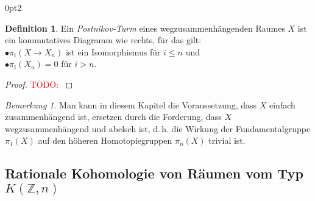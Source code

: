 \documentclass[11pt, a4paper, german]{article}
\theoremstyle{definition}
\newtheorem*{defn}{Definition}
\theoremstyle{remark}
\newtheorem*{bem}{Bemerkung}
\newcommand{\TODO}[1]{\textcolor{red}{TODO: #1}} %
\newcommand{\Z}{\mathbb{Z}} %
\renewcommand{\dh}{d.\,h.} %
\newenvironment{centertikzcd}
  {\begin{center}\begin{tikzcd}}
  {\end{tikzcd}\end{center}}
\begin{document}
\renewcommand\windowpagestuff{
  \iffalse
  \begin{centertikzcd}[ampersand replacement=\&, column sep=0.5cm, row sep=0.2cm]
    \& \vdots \arrow[d] \\
    \& X_3 \arrow[d] \\
    \& X_2 \arrow[d] \\
    X \arrow[r] \arrow[ru] \arrow[ruu] \& X_1
  \end{centertikzcd}
  \fi
  \vspace{1cm}
  \begin{centertikzcd}[ampersand replacement=\&, column sep=0.2cm, row sep=0.5cm]
    \&\&\& X \arrow[dll] \arrow[dl] \arrow[d] \\
    \dots \arrow[r] \&
    X_3 \arrow[r] \&
    X_2 \arrow[r] \&
    X_1
  \end{centertikzcd}
}
\opencutright
\begin{cutout}{0}{\dimexpr\linewidth-4.5cm\relax}{0pt}{2}
  \begin{defn}
    Ein \emph{Postnikov-Turm} eines wegzusammenhängenden Raumes $X$ ist ein kommutatives Diagramm wie rechts, für das gilt: \\[3pt]
    \quad$\bullet$\enspace $\pi_i(X \to X_n)$ ist ein Isomorphismus für $i \leq n$ und \\
    \quad$\bullet$\enspace $\pi_i(X_n) = 0$ für $i > n$.
  \end{defn}
\end{cutout}

\begin{proof}
  \TODO{}
\end{proof}

\begin{bem}
  Man kann in diesem Kapitel die Voraussetzung, dass $X$ einfach zusammenhängend ist, ersetzen durch die Forderung, dass $X$ wegzusammenhängend und abelsch ist, \dh{} die Wirkung der Fundamentalgruppe $\pi_1(X)$ auf den höheren Homotopiegruppen $\pi_n(X)$ trivial ist.
\end{bem}

\subsection{Rationale Kohomologie von Räumen vom Typ $K(\Z, n)$}

\end{document}
